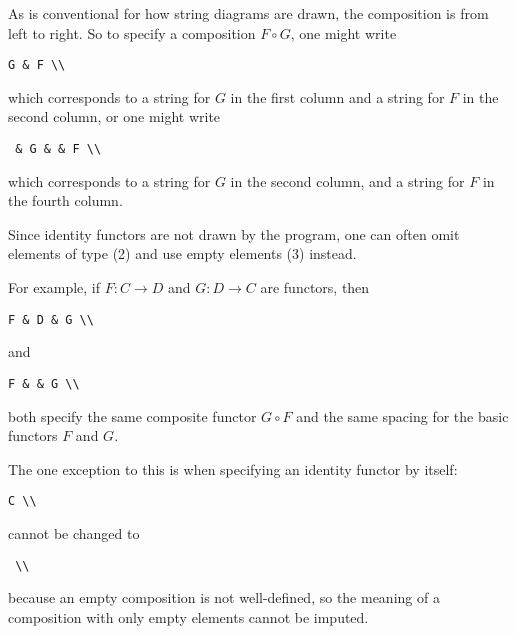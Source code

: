 \documentclass{amsart}
\newcommand{\vlength}{0.2cm}
\begin{document}
As is conventional for how string diagrams are drawn, the composition is from left to right.
So to specify a composition $F\circ G$, one might write
\vspace{\vlength}
\begin{verbatim}
G & F \\
\end{verbatim}
\vspace{\vlength}
which corresponds to a string for $G$ in the first column and a string for $F$ in the second column,
or one might write
\vspace{\vlength}
\begin{verbatim}
 & G & & F \\
\end{verbatim}
\vspace{\vlength}
which corresponds to a string for $G$ in the second column, and a string for $F$ in the fourth
column.
\begin{remark}
    Since identity functors are not drawn by the program, one can often omit elements of type (2)
        and use empty elements (3) instead.

    For example, if $F:C\to D$ and $G:D\to C$ are functors, then
\vspace{\vlength}
\begin{verbatim}
F & D & G \\
\end{verbatim}
\vspace{\vlength}
    and
\vspace{\vlength}
\begin{verbatim}
F & & G \\
\end{verbatim}
\vspace{\vlength}
    both specify the same composite functor $G\circ F$ and the same spacing for the
    basic functors $F$ and $G$.

The one exception to this is when specifying an identity functor by itself:
\vspace{\vlength}
\begin{verbatim}
C \\
\end{verbatim}
\vspace{\vlength}
cannot be changed to
\vspace{\vlength}
\begin{verbatim}
 \\
\end{verbatim}
\vspace{\vlength}
because an empty composition is not well-defined, so the meaning of a composition
with only empty elements cannot be imputed.
\end{remark}
\end{document}
